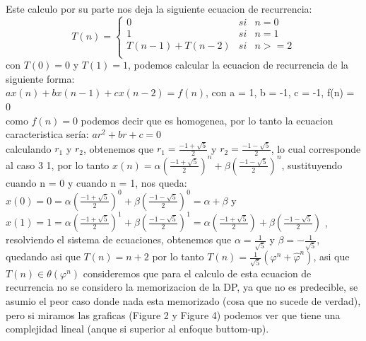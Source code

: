 \documentclass[spanish]{article}
\begin{document}
	Este calculo por su parte nos deja la siguiente ecuacion de recurrencia:\\
	\begin{equation}
		T(n)= \left\{ \begin{array}{lcc}
			0 &   si  & n = 0 \\
			1 &   si  & n = 1 \\
			T(n-1) +T(n-2) &  si &  n >= 2  \\
		\end{array}
		\right.
	\end{equation}
	con $T(0) = 0$ y $T(1) = 1$, podemos calcular la ecuacion de recurrencia de la siguiente forma:\\$		ax(n)+bx(n-1)+cx(n-2)=f(n)$, con a = 1, b = -1, c = -1, f(n) = 0\\
	como $f(n)=0$ podemos decir que es homogenea, por lo tanto la ecuacion caracteristica sería: $ar^2+br+c=0$\\
	calculando $r_1$ y $r_2$, obtenemos que $r_1=\frac{-1+\sqrt{5}}{2}$ y $r_2=\frac{-1-\sqrt{5}}{2}$, lo cual corresponde al caso 3
	1, por lo tanto $x(n)=\alpha(\frac{-1+\sqrt{5}}{2})^n+\beta(\frac{-1-\sqrt{5}}{2})^n$, sustituyendo cuando n = 0 y cuando n = 1, nos queda: $x(0) = 0 = \alpha(\frac{-1+\sqrt{5}}{2})^0 + \beta(\frac{-1-\sqrt{5}}{2})^0 = \alpha + \beta$ y $x(1) = 1 = \alpha(\frac{-1+\sqrt{5}}{2})^1 + \beta(\frac{-1-\sqrt{5}}{2})^1 = \alpha(\frac{-1+\sqrt{5}}{2}) + \beta(\frac{-1-\sqrt{5}}{2})$
	, resolviendo el sistema de ecuaciones, obtenemos que $\alpha=\frac{1}{\sqrt{5}}$ y $\beta=-\frac{1}{\sqrt{5}}$, quedando asi que $T(n) = n+2$ por lo tanto $T(n) = \frac{1}{\sqrt{5}}(\varphi^n + \hat{\varphi }^n)$, asi que $T(n)\in \theta(\varphi^n)$ consideremos que para el calculo de esta ecuacion de recurrencia no se considero la memorizacion de la DP, ya que no es predecible, se asumio el peor caso donde nada esta memorizado (cosa que no sucede de verdad), pero si miramos las graficas (Figure 2 y Figure 4) podemos ver que tiene una complejidad lineal (anque si superior al enfoque buttom-up).
\end{document}
